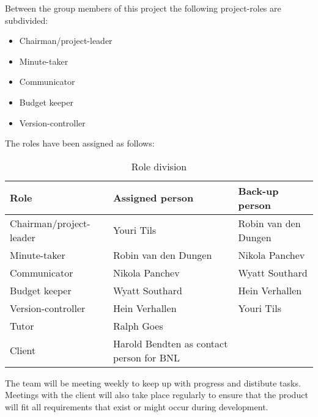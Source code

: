 Between the group members of this project the following project-roles are subdivided:
\begin{itemize}
    \setlength\itemsep{-0.3em}
    \item Chairman/project-leader
    \item Minute-taker
    \item Communicator
    \item Budget keeper
    \item Version-controller
\end{itemize}

The roles have been assigned as follows:
\begin{table}[!h]
    \begin{tabular}{|l|l|l|}
        \hline
        \textbf{Role}           & \textbf{Assigned person}  & \textbf{Back-up person} \\ \hline
        Chairman/project-leader & Youri Tils                & Robin van den Dungen    \\ \hline
        Minute-taker            & Robin van den Dungen      & Nikola Panchev          \\ \hline
        Communicator            & Nikola Panchev            & Wyatt Southard          \\ \hline
        Budget keeper           & Wyatt Southard            & Hein Verhallen          \\ \hline
        Version-controller      & Hein Verhallen            & Youri Tils              \\ \hline
        Tutor                   & Ralph Goes                &                         \\ \hline
        Client                  & Harold Bendten as contact person for BNL &          \\ \hline         
    \end{tabular}
    \caption{Role division}
\end{table}

The team will be meeting weekly to keep up with progress and distibute tasks. Meetings with the client
will also take place regularly to ensure that the product will fit all requirements that exist or might occur during 
development. 